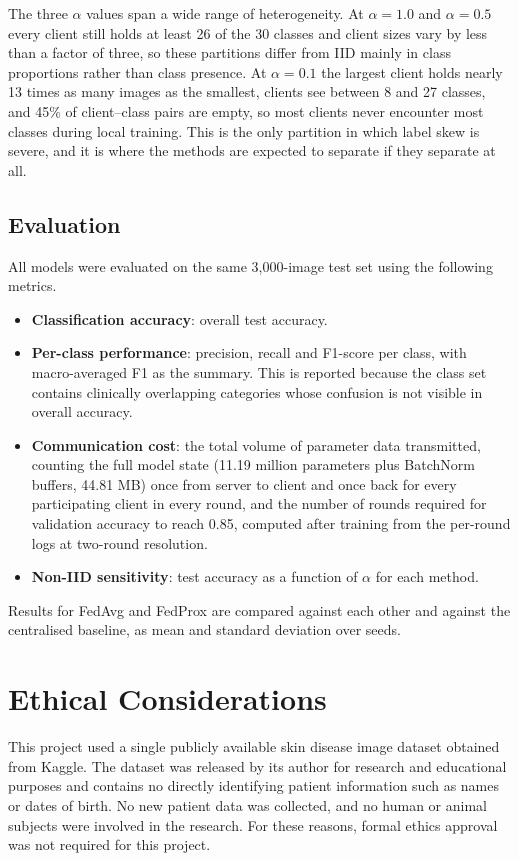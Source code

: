 \documentclass[12pt,openany,a4paper]{book}
\begin{document}
The three $\alpha$ values span a wide range of heterogeneity. At $\alpha = 1.0$ and $\alpha = 0.5$ every client still holds at least 26 of the 30 classes and client sizes vary by less than a factor of three, so these partitions differ from IID mainly in class proportions rather than class presence. At $\alpha = 0.1$ the largest client holds nearly 13 times as many images as the smallest, clients see between 8 and 27 classes, and 45\% of client--class pairs are empty, so most clients never encounter most classes during local training. This is the only partition in which label skew is severe, and it is where the methods are expected to separate if they separate at all.

\subsection{Evaluation}

All models were evaluated on the same 3,000-image test set using the following metrics.

\begin{itemize}
  \item \textbf{Classification accuracy}: overall test accuracy.
  \item \textbf{Per-class performance}: precision, recall and F1-score per class, with macro-averaged F1 as the summary. This is reported because the class set contains clinically overlapping categories whose confusion is not visible in overall accuracy.
  \item \textbf{Communication cost}: the total volume of parameter data transmitted, counting the full model state (11.19 million parameters plus BatchNorm buffers, 44.81 MB) once from server to client and once back for every participating client in every round, and the number of rounds required for validation accuracy to reach 0.85, computed after training from the per-round logs at two-round resolution.
  \item \textbf{Non-IID sensitivity}: test accuracy as a function of $\alpha$ for each method.
\end{itemize}
Results for FedAvg and FedProx are compared against each other and against the centralised baseline, as mean and standard deviation over seeds.

\section{Ethical Considerations}
This project used a single publicly available skin disease image dataset obtained from Kaggle. The dataset was released by its author for research and educational purposes and contains no directly identifying patient information such as names or dates of birth. No new patient data was collected, and no human or animal subjects were involved in the research. For these reasons, formal ethics approval was not required for this project.
\end{document}
